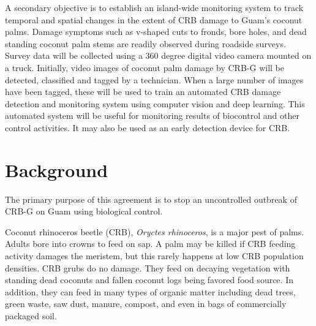 \documentclass[14pt,english,letterpaper]{scrartcl}
\begin{document}
A secondary objective is to establish an island-wide monitoring system to track temporal and
spatial changes in the extent of CRB damage to Guam’s coconut palms. Damage symptoms such
as v-shaped cuts to fronds, bore holes, and dead standing coconut palm stems are readily
observed during roadside surveys. Survey data will be collected using a 360 degree digital video
camera mounted on a truck. Initially, video images of coconut palm damage by CRB-G will be
detected, classified and tagged by a technician. When a large number of images have been
tagged, these will be used to train an automated CRB damage detection and monitoring
system using computer vision and deep learning. This automated system will be useful for monitoring results of biocontrol and other control activities. It may also be used as an early detection device for CRB.

\section{Background} 

%

The primary purpose of this agreement is to stop an uncontrolled outbreak of CRB-G on Guam using biological control.

Coconut rhinoceros beetle (CRB), \textit{Oryctes rhinoceros}, is a major pest of palms. Adults bore into
crowns to feed on sap. A palm may be killed if CRB feeding activity damages the meristem, but
this rarely happens at low CRB population densities. CRB grubs do no damage. They feed on
decaying vegetation with standing dead coconuts and fallen coconut logs being favored food source. In
addition, they can feed in many types of organic matter including dead trees, green waste, saw
dust, manure, compost, and even in bags of commercially packaged soil.
\end{document}
